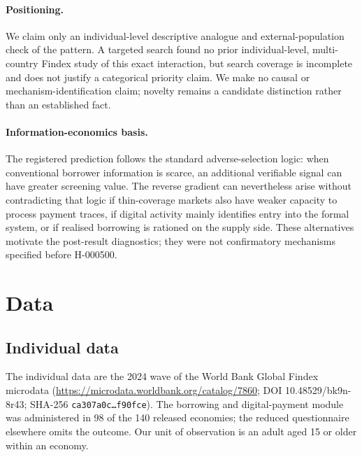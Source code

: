 \paragraph{Positioning.} We claim only an individual-level descriptive analogue and
external-population check of the \citeauthor{GalileaFaraziMare2026} pattern. A targeted
search found no prior individual-level, multi-country Findex study of this exact
interaction, but search coverage is incomplete and does not justify a categorical priority
claim. We make no causal or mechanism-identification claim; novelty remains a candidate
distinction rather than an established fact.

\paragraph{Information-economics basis.} The registered prediction follows the standard
adverse-selection logic: when conventional borrower information is scarce, an additional
verifiable signal can have greater screening value. The reverse gradient can nevertheless
arise without contradicting that logic if thin-coverage markets also have weaker capacity to
process payment traces, if digital activity mainly identifies entry into the formal system,
or if realised borrowing is rationed on the supply side. These alternatives motivate the
post-result diagnostics; they were not confirmatory mechanisms specified before H-000500.

\section{Data}

\subsection{Individual data}

The individual data are the 2024 wave of the World Bank Global Findex microdata
(\url{https://microdata.worldbank.org/catalog/7860}; DOI 10.48529/bk9n-8r43; SHA-256
\texttt{ca307a0c\ldots f90fce}). The borrowing and digital-payment module was administered
in 98 of the 140 released economies; the reduced questionnaire elsewhere omits the outcome.
Our unit of observation is an adult aged 15 or older within an economy.

